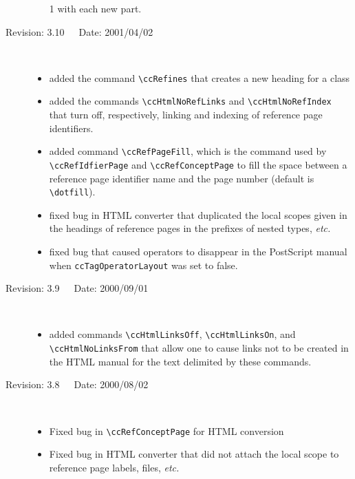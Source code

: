 \documentclass[11pt]{article}
\begin{document}
\begin{description}
\begin{itemize}
             1 with each new part.
    \end{itemize}
    \item[Revision: 3.10~~~Date: 2001/04/02]~\\[-3mm]
    \begin{itemize}
       \item added the command \verb|\ccRefines| that creates a new
             heading for a class
       \item added the commands \verb|\ccHtmlNoRefLinks|
             and \verb|\ccHtmlNoRefIndex| that turn off, respectively,
             linking and indexing of reference page identifiers.
       \item added command \verb|\ccRefPageFill|, which is the command used
             by \verb|\ccRefIdfierPage| and \verb|\ccRefConceptPage| to fill 
             the space between a reference page identifier name and
             the page number (default is \verb|\dotfill|).
       \item fixed bug in HTML converter that duplicated the local scopes
             given in the headings of reference pages in the prefixes of
             nested types, {\em etc.}
       \item fixed bug that caused operators to disappear in the
             PostScript manual when \verb|ccTagOperatorLayout| was set to false.
    \end{itemize}
    \item[Revision: 3.9~~~Date: 2000/09/01]~\\[-3mm]
    \begin{itemize}
       \item added commands \verb|\ccHtmlLinksOff|, \verb|\ccHtmlLinksOn|,
             and \verb|\ccHtmlNoLinksFrom| that allow one to cause links not 
             to be created in the HTML manual for the text delimited by 
             these commands.
    \end{itemize}
    \item[Revision: 3.8~~~Date: 2000/08/02]~\\[-3mm]
    \begin{itemize}
        \item Fixed bug in \verb|\ccRefConceptPage| for HTML conversion
        \item Fixed bug in HTML converter that did not attach the local scope
              to reference page labels, files, {\em etc.}

\end{itemize}
\end{description}
\end{document}
